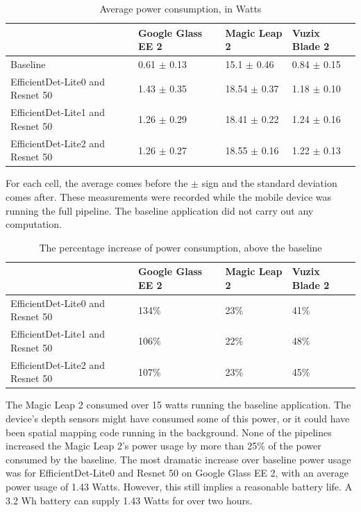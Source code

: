 \begin{table}
\begin{tabular}{|l||l|l|l|}
  \hline
  & Google Glass EE 2 & Magic Leap 2 & Vuzix Blade 2\\
  \hline
  \hline
  Baseline & 0.61 $\pm$ 0.13 & 15.1 $\pm$ 0.46 & 0.84 $\pm$ 0.15\\
  EfficientDet-Lite0 and Resnet 50 & 1.43 $\pm$ 0.35 & 18.54 $\pm$ 0.37 & 1.18 $\pm$ 0.10\\
  EfficientDet-Lite1 and Resnet 50 & 1.26 $\pm$ 0.29 & 18.41 $\pm$ 0.22 & 1.24 $\pm$ 0.16\\
  EfficientDet-Lite2 and Resnet 50 & 1.26 $\pm$ 0.27 & 18.55 $\pm$ 0.16 & 1.22 $\pm$ 0.13\\
  \hline
\end{tabular}
\begin{captiontext}
    For each cell, the average comes before the $\pm$ sign and the standard
    deviation comes after.
    These measurements were recorded while the mobile device was running the
    full pipeline.
    The baseline application did not carry out any computation.
  \end{captiontext}
  \caption{
    Average power consumption, in Watts
  }\label{tab:mobile_power}
\end{table}

\begin{table}
\begin{tabular}{|l||l|l|l|}
  \hline
  & Google Glass EE 2 & Magic Leap 2 & Vuzix Blade 2\\
  \hline
  \hline
  EfficientDet-Lite0 and Resnet 50 & 134\% & 23\% & 41\%\\
  EfficientDet-Lite1 and Resnet 50 & 106\% & 22\% & 48\%\\
  EfficientDet-Lite2 and Resnet 50 & 107\% & 23\% & 45\%\\
  \hline
\end{tabular}
  \caption{
    The percentage increase of power consumption, above the baseline
  }\label{tab:mobile_power_pi}
\end{table}

The Magic Leap 2 consumed over 15 watts running the baseline application.
The device's depth sensors might have consumed some of this power, or it could
have been spatial mapping code running in the background.
None of the pipelines increased the Magic Leap 2's power usage by more than 25\%
of the power consumed by the baseline.
The most dramatic increase over baseline power usage was for EfficientDet-Lite0
and Resnet 50 on Google Glass EE 2, with an average power usage of 1.43 Watts.
However, this still implies a reasonable battery life.
A 3.2 Wh battery can supply 1.43 Watts for over two hours.

